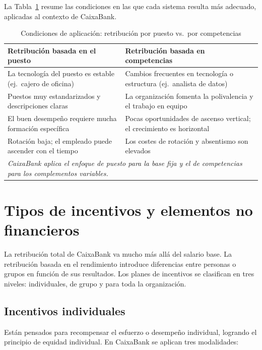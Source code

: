 La Tabla~\ref{tab:puesto-competencias} resume las condiciones en las que cada sistema resulta más adecuado, aplicadas al contexto de CaixaBank.

\begin{table}[H]
\centering
\caption{Condiciones de aplicación: retribución por puesto vs.\ por competencias}
\label{tab:puesto-competencias}
\small
\begin{tabularx}{\textwidth}{|X|X|}
\hline
\textbf{Retribución basada en el puesto} & \textbf{Retribución basada en competencias} \\
\hline
La tecnología del puesto es estable (ej.\ cajero de oficina) & Cambios frecuentes en tecnología o estructura (ej.\ analista de datos) \\
\hline
Puestos muy estandarizados y descripciones claras & La organización fomenta la polivalencia y el trabajo en equipo \\
\hline
El buen desempeño requiere mucha formación específica & Pocas oportunidades de ascenso vertical; el crecimiento es horizontal \\
\hline
Rotación baja; el empleado puede ascender con el tiempo & Los costes de rotación y absentismo son elevados \\
\hline
\multicolumn{2}{|l|}{\textit{CaixaBank aplica el enfoque de puesto para la base fija y el de competencias para los complementos variables.}} \\
\hline
\end{tabularx}
\end{table}

\section{Tipos de incentivos y elementos no financieros}

La retribución total de CaixaBank va mucho más allá del salario base. La retribución basada en el rendimiento introduce diferencias entre personas o grupos en función de sus resultados. Los planes de incentivos se clasifican en tres niveles: individuales, de grupo y para toda la organización.

\subsection{Incentivos individuales}

Están pensados para recompensar el esfuerzo o desempeño individual, logrando el principio de equidad individual. En CaixaBank se aplican tres modalidades:

